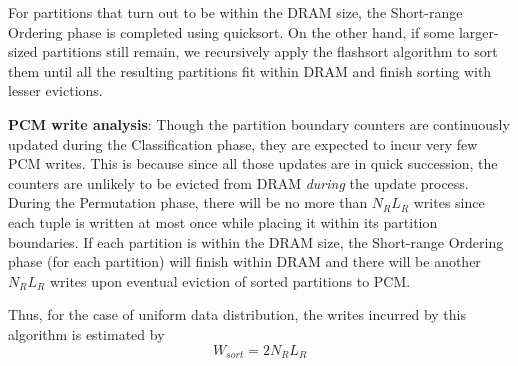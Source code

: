 %

For partitions that turn
out to be within the DRAM size, the Short-range Ordering phase is completed using
quicksort. On the other hand, if some larger-sized
partitions still remain, we recursively apply the flashsort
algorithm to sort them until all the resulting partitions fit within DRAM and finish sorting with lesser evictions.

\textbf{PCM write analysis}: Though the partition boundary counters
are continuously updated during the Classification phase, they are expected to
incur very few PCM writes. This is because since all those updates are
in quick succession, the counters are unlikely to be evicted from DRAM
\emph{during} the update process. During the
Permutation phase, there will be no more than $N_R L_R$ writes since each tuple is written
at most once while placing it within its partition boundaries. If each
partition is within the DRAM size, the Short-range Ordering phase (for each partition)
will finish within DRAM and there will be another $N_R L_R$ writes upon
eventual eviction of sorted partitions to PCM. 

Thus, for the case of uniform data distribution, the writes incurred by this algorithm is estimated by
\begin{equation}
\label{eq:sort}
  W_{sort} = 2N_RL_R
\end{equation}